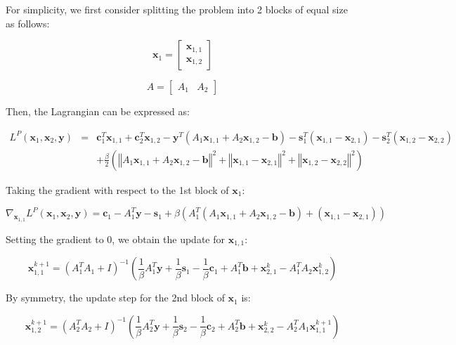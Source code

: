 \documentclass{article}
\begin{document}
For simplicity, we first consider splitting the problem into 2 blocks
of equal size as follows:

\[
\mathbf{x}_{1}=\begin{bmatrix}\mathbf{x}_{1,1}\\
\mathbf{x}_{1,2}
\end{bmatrix}
\]


\[
A=\begin{bmatrix}A_{1} & A_{2}\end{bmatrix}
\]


Then, the Lagrangian can be expressed as:

\begin{eqnarray*}
L^{P}(\mathbf{x}_{1},\mathbf{x}_{2},\mathbf{y}) & = & \mathbf{c}_{1}^{T}\mathbf{x}_{1,1}+\mathbf{c}_{2}^{T}\mathbf{x}_{1,2}-\mathbf{y}^{T}\left(A_{1}\mathbf{x}_{1,1}+A_{2}\mathbf{x}_{1,2}-\mathbf{b}\right)-\mathbf{s}_{1}^{T}\left(\mathbf{x}_{1,1}-\mathbf{x}_{2,1}\right)-\mathbf{s}_{2}^{T}\left(\mathbf{x}_{1,2}-\mathbf{x}_{2,2}\right)\\
 &  & +\frac{\beta}{2}\left(\left\Vert A_{1}\mathbf{x}_{1,1}+A_{2}\mathbf{x}_{1,2}-\mathbf{b}\right\Vert ^{2}+\left\Vert \mathbf{x}_{1,1}-\mathbf{x}_{2,1}\right\Vert ^{2}+\left\Vert \mathbf{x}_{1,2}-\mathbf{x}_{2,2}\right\Vert ^{2}\right)
\end{eqnarray*}


Taking the gradient with respect to the 1st block of $\mathbf{x}_{1}$:

\[
\nabla_{\mathbf{x}_{1,1}}L^{P}(\mathbf{x}_{1},\mathbf{x}_{2},\mathbf{y})=\mathbf{c}_{1}-A_{1}^{T}\mathbf{y}-\mathbf{s}_{1}+\beta\left(A_{1}^{T}\left(A_{1}\mathbf{x}_{1,1}+A_{2}\mathbf{x}_{1,2}-\mathbf{b}\right)+\left(\mathbf{x}_{1,1}-\mathbf{x}_{2,1}\right)\right)
\]


Setting the gradient to 0, we obtain the update for $\mathbf{x}_{1,1}$:

\[
\mathbf{x}_{1,1}^{k+1}=\left(A_{1}^{T}A_{1}+I\right)^{-1}\left(\frac{1}{\beta}A_{1}^{T}\mathbf{y}+\frac{1}{\beta}\mathbf{s}_{1}-\frac{1}{\beta}\mathbf{c}_{1}+A_{1}^{T}\mathbf{b}+\mathbf{x}_{2,1}^{k}-A_{1}^{T}A_{2}\mathbf{x}_{1,2}^{k}\right)
\]


By symmetry, the update step for the 2nd block of $\mathbf{x}_{1}$
is:

\[
\mathbf{x}_{1,2}^{k+1}=\left(A_{2}^{T}A_{2}+I\right)^{-1}\left(\frac{1}{\beta}A_{2}^{T}\mathbf{y}+\frac{1}{\beta}\mathbf{s}_{2}-\frac{1}{\beta}\mathbf{c}_{2}+A_{2}^{T}\mathbf{b}+\mathbf{x}_{2,2}^{k}-A_{2}^{T}A_{1}\mathbf{x}_{1,1}^{k+1}\right)
\]
\end{document}
